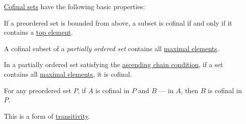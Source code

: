 \begin{proposition}\label{thm:def:cofinal_set}
  \hyperref[def:cofinal_set]{Cofinal sets} have the following basic properties:
  \begin{thmenum}
     If a preordered set is bounded from above, a subset is cofinal if and only if it contains a \hyperref[def:extremal_points/top_and_bottom]{top element}.

     A cofinal subset of a \emph{partially ordered set} contains all \hyperref[def:extremal_points/maximal_and_minimal_element]{maximal elements}.

     In a partially ordered set satisfying the \hyperref[def:chain_condition]{ascending chain condition}, if a set contains all \hyperref[def:extremal_points/maximal_and_minimal_element]{maximal elements}, it is cofinal.

     For any preordered set \( P \), if \( A \) is cofinal in \( P \) and \( B \) --- in \( A \), then \( B \) is cofinal in \( P \).

    This is a form of \hyperref[def:binary_relation/transitive]{transitivity}.
  \end{thmenum}
\end{proposition}

